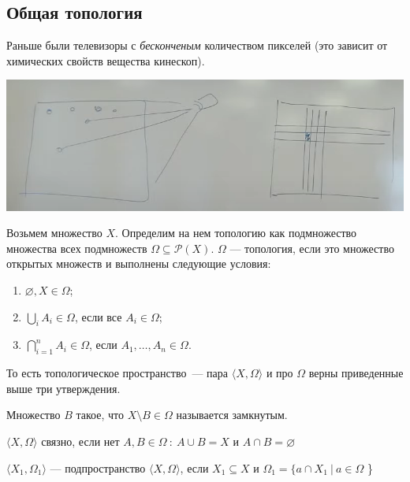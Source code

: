 \subsection{Общая топология}

Раньше были телевизоры с \textit{бесконченым} количеством пикселей (это зависит от химических свойств вещества кинескоп).

\begin{center}
    \includegraphics[scale=0.8]{img/topology_tv_example}
\end{center}

Возьмем множество $X$. Определим на нем топологию как подмножество множества всех подмножеств
$\Omega \subseteq \mathcal{P}(X)$. $\Omega$ --- топология, если это множество открытых множеств и выполнены следующие условия:
\begin{enumerate}
    \item $\varnothing, X \in \Omega$;
    \item $\bigcup\limits_i A_i \in \Omega$, если все $A_i \in \Omega$;
    \item $\bigcap\limits_{i = 1} ^ n A_i \in \Omega$, если $A_1, \dots, A_n \in \Omega$.
\end{enumerate}

То есть топологическое пространство~--- пара $\langle X, \Omega \rangle$ и про $\Omega$ верны приведенные выше три утверждения.

\begin{definition}
 Множество $B$ такое, что $X \setminus B \in \Omega$ называется замкнутым.
\end{definition}

\begin{definition}
     $\langle X, \Omega \rangle$ связно, если нет $A, B \in \Omega ~:~ A \cup B = X$ и $A \cap B = \varnothing$
\end{definition}

\begin{definition}[Подпространство]
    $\langle X_1, \Omega_1 \rangle $ --- подпространство $\langle X, \Omega \rangle$, если
    $X_1 \subseteq X$ и $\Omega_1 = \{ a \cap X_1 ~|~ a \in \Omega$ \}
\end{definition}

